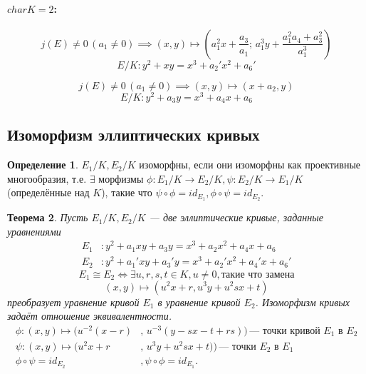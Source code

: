 \documentclass[12pt]{article}
\newtheorem{theorem}{Теорема}
\theoremstyle{definition}
\newtheorem{definition}[theorem]{Определение}
\theoremstyle{definition}
\theoremstyle{definition}
\begin{document}
            \paragraph{$char K = 2$:} 
            \[
            j(E)\neq0 \, (a_1\neq0) \implies (x, y) \mapsto (a_1^2x+\frac{a_3}{a_1}; \, a_1^3y + \frac{a_1^2a_4+a_3^2}{a_1^3})
            \]
            \begin{equation}
                E/K: y^2+xy=x^3+a_2'x^2+a_6'
            \end{equation}
            
            \[
            j(E)\neq0 \, (a_1\neq0) \implies (x, y) \mapsto (x+a_2, y)
            \]
            \begin{equation}
                E/K: y^2+a_3y = x^3+a_4x+a_6
            \end{equation}
            
        \subsection{Изоморфизм эллиптических кривых}
            \begin{definition} 
                $E_1/K, E_2/K$ изоморфны, если они изоморфны как проективные многообразия, т.е. $\exists$ морфизмы $\phi: E_1/K \to E_2/K, \psi: E_2/K \to E_1/K$ (определённые над $K$), такие что $\psi \circ \phi = id_{E_1}, \phi \circ \psi = id_{E_2}$.
            \end{definition}
            
            \begin{theorem}
                Пусть $E_1/K, E_2/K$ — две эллиптические кривые, заданные уравнениями 
                \begin{align}
                    E_1&: y^2+a_1xy + a_3y = x^3 + a_2x^2 + a_4x + a_6 \\ \nonumber
                    E_2&: y^2+a_1'xy + a_3'y = x^3 + a_2'x^2 + a_4'x + a_6'
                \end{align}
                \begin{equation*}
                E_1 \cong E_2 \iff \exists u,r,s,t \in K, u\neq0, \text{такие что замена}
                \end{equation*}
                \begin{equation}
                    (x,y) \mapsto (u^2x+r, u^3y+ u^2sx+t)
                \end{equation}
                преобразует уравнение кривой $E_1$ в уравнение кривой $E_2$. Изоморфизм кривых задаёт отношение эквивалентности.
                \begin{align*}
                    \phi : (x,y)\mapsto (u^{-2}(x-r)&, \,u^{-3}(y-sx-t+rs))\,\text{— точки кривой $E_1$ в $E_2$} \\
                    \psi : (x,y)\mapsto (u^2x+r&, \,u^3y+u^2sx+t))\, \text{— точки $E_2$ в $E_1$} \\
                    \phi \circ \psi = id_{E_2}&, \psi \circ \phi = id_{E_1}.
                \end{align*}
            \end{theorem}
\end{document}
